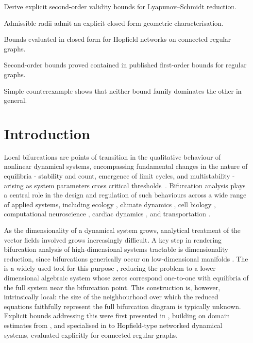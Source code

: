\documentclass[a4paper]{cas-dc}
\begin{document}
\begin{highlights}
    \item Derive explicit second-order validity bounds for Lyapunov--Schmidt reduction.
    \item Admissible radii admit an explicit closed-form geometric characterisation.
    \item Bounds evaluated in closed form for Hopfield networks on connected regular graphs.
    \item Second-order bounds proved contained in published first-order bounds for regular graphs.
    \item Simple counterexample shows that neither bound family dominates the other in general.
\end{highlights}

\maketitle



\section{Introduction}
\label{sec:introduction}

Local bifurcations are points of transition in the qualitative behaviour of nonlinear dynamical systems, encompassing fundamental changes in the nature of equilibria - stability and count, emergence of limit cycles, and multistability - arising as system parameters cross critical thresholds~\cite{guckenheimer2013nonlinear}. Bifurcation analysis plays a central role in the design and regulation of such behaviours across a wide range of applied systems, including ecology \cite{scheffer2009early,dai2012generic}, climate dynamics \cite{ashwin2012tipping,lenton2008tipping}, cell biology \cite{tyson2003sniffers,novak2008design}, computational neuroscience \cite{izhikevich2000neural}, cardiac dynamics \cite{qu2014nonlinear}, and transportation \cite{orosz2010traffic}.

As the dimensionality of a dynamical system grows, analytical treatment of the vector fields involved grows increasingly difficult. A key step in rendering bifurcation analysis of high-dimensional systems tractable is dimensionality reduction, since bifurcations generically occur on low-dimensional manifolds \cite{pliss1964reduction,kelley1966stable}. The \LSR{} is a widely used tool for this purpose \cite{golubitsky2023dynamics,sidorov2013lyapunov}, reducing the problem to a lower-dimensional algebraic system whose zeros correspond one-to-one with equilibria of the full system near the bifurcation point. This construction is, however, intrinsically local: the size of the neighbourhood over which the reduced equations faithfully represent the full bifurcation diagram is typically unknown. Explicit bounds addressing this were first presented in \cite{gupta2024estimates}, building on \ImFT{} domain estimates from \cite{jindal2024estimates}, and specialised in \cite{gupta2025bounds} to Hopfield-type networked dynamical systems, evaluated explicitly for connected regular graphs.
\end{document}
